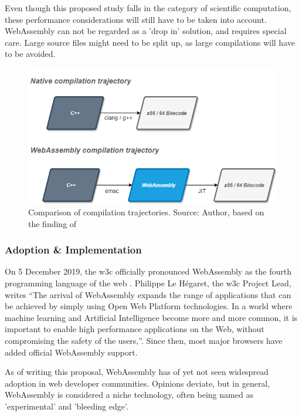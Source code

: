Even though this proposed study falls in the category of scientific computation, these performance considerations will still have to be taken into account. WebAssembly can not be regarded as a 'drop in' solution, and requires special care. Large source files might need to be split up, as large compilations will have to be avoided.  

\begin{figure}[!tbp]
  \centering
  \begin{minipage}[b]{0.80\textwidth}
    \includegraphics[width=\textwidth]{../schemas/wasm-performance/wasm-perf.png}
    \caption{Comparison of compilation trajectories. Source: Author, based on the finding of \cite{jangda_not_2019}}
    \label{fig:wasm-trajectory}
  \end{minipage}
\end{figure}

\subsubsection*{Adoption \& Implementation}

On 5 December 2019, the \ac{w3c} officially pronounced WebAssembly as the fourth programming language of the web \cite{w3c_world_2019}. Philippe Le Hégaret, the \ac{w3c} Project Lead, writes “The arrival of WebAssembly expands the range of applications that can be achieved by simply using Open Web Platform technologies. In a world where machine learning and Artificial Intelligence become more and more common, it is important to enable high performance applications on the Web, without compromising the safety of the users,”. Since then, most major browsers have added official WebAssembly support.

As of writing this proposal, WebAssembly has of yet not seen widespread adoption in web developer communities. Opinions deviate, but in general, WebAssembly is considered a niche technology, often being named as 'experimental' and 'bleeding edge'. 

